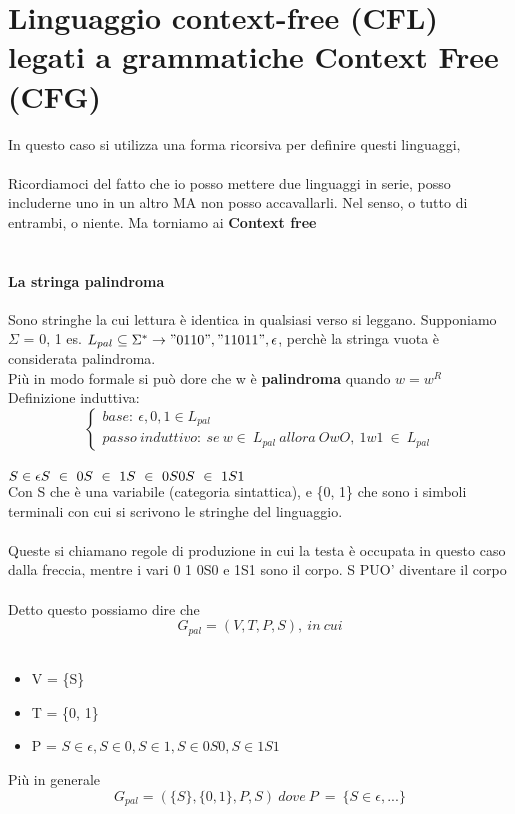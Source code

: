 \documentclass[12pt, a4paper, openany, oneside]{book}
\begin{document}
\section{Linguaggio context-free (CFL) legati a grammatiche Context Free (CFG)}
In questo caso si utilizza una forma ricorsiva per definire questi linguaggi,
\\ \\
Ricordiamoci del fatto che io posso mettere due linguaggi in serie, posso 
includerne uno in un altro MA non posso accavallarli. Nel senso, o tutto di 
entrambi, o niente. Ma torniamo ai \textbf{Context free}
\\ \\
\paragraph{La stringa palindroma}
Sono stringhe la cui lettura è identica in qualsiasi verso si leggano. Supponiamo
$\Sigma$ = {0, 1} es. $L_{pal} \subseteq \Sigma ^{*} \to "0110", "11011", 
\epsilon$, perchè la stringa vuota è considerata palindroma. \\ 
Più in modo formale si può dore che w è \textbf{palindroma} quando $w = w^{R}$
Definizione induttiva:
\[
\begin{cases}
base:~\epsilon, 0, 1 \in L_{pal} \\
passo~induttivo:~ se ~w\in ~L_{pal} ~allora ~OwO, ~1w1 ~\in ~L_{pal}
\end{cases}
\]
\\
$
S \in \epsilon\\
S ~ \in ~ 0 \\
S ~ \in ~ 1 \\
S ~ \in ~ 0S0 \\
S ~ \in ~ 1S1$ \\
Con S che è una variabile (categoria sintattica), e \{0, 1\} che sono i simboli
terminali con cui si scrivono le stringhe del linguaggio.\\ \\
Queste si chiamano regole di produzione in cui la testa è occupata in questo
caso dalla freccia, mentre i vari 0 1 0S0 e 1S1 sono il corpo. S PUO' diventare
il corpo \\ \\ 
Detto questo possiamo dire che
$$G_{pal} = (V, T, P, S), ~in ~cui $$\\
\begin{itemize}
	\item V = \{S\}
	\item T = \{0, 1\}
	\item P = $S \in \epsilon, S \in 0, S \in 1, S \in 0S0, S \in 1S1$
\end{itemize}
Più in generale
$$G_{pal} = (\{S\},\{0, 1\}, P, S) ~  dove ~  P  ~ = ~  \{S \in \epsilon, ...\}$$
\end{document}
